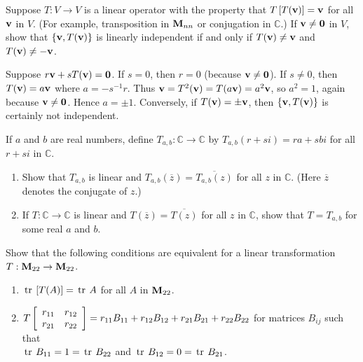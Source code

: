 \begin{multicols}{2}
\begin{ex}
Suppose $T : V \to V$ is a linear operator with the property that $T\left[T(\textbf{v})\right] = \textbf{v}$ for all $\textbf{v}$ in $V$. (For example, transposition in $\textbf{M}_{nn}$ or conjugation in $\mathbb{C}$.) If $\textbf{v} \neq \textbf{0}$ in $V$, show that $\{\textbf{v}, T(\textbf{v})\}$ is linearly independent if and only if $T(\textbf{v}) \neq \textbf{v}$ and $T(\textbf{v}) \neq -\textbf{v}$.

\begin{sol}
Suppose $r\textbf{v} + sT(\textbf{v}) = \textbf{0}$. If $s = 0$, then $r = 0$ (because $\textbf{v} \neq \textbf{0}$). If $s \neq 0$, then $T(\textbf{v}) = a\textbf{v}$ where $a = -s^{-1}r$. Thus $\textbf{v} = T^{2}(\textbf{v}) = T(a\textbf{v}) = a^{2}\textbf{v}$, so $a^{2} = 1$, again because $\textbf{v} \neq \textbf{0}$. Hence $a = \pm 1$. Conversely, if $T(\textbf{v}) = \pm\textbf{v}$, then $\{\textbf{v}, T(\textbf{v})\}$ is certainly not independent.
\end{sol}
\end{ex}

\begin{ex}
If $a$ and $b$ are real numbers, define $T_{a,b} : \mathbb{C} \to \mathbb{C}$ by $T_{a,b}(r + si) = ra + sbi$ for all $r + si$ in $\mathbb{C}$.


\begin{enumerate}[label={\alph*.}]
\item Show that $T_{a,b}$ is linear and $T_{a,b}(\overline{z}) = \overline{T_{a,b}(z)}$ for all $z$ in $\mathbb{C}$. (Here $\overline{z}$ denotes the conjugate of $z$.)

\item If $T : \mathbb{C} \to \mathbb{C}$  is linear and $T(\overline{z}) = \overline{T(z)}$ for all $z$ in $\mathbb{C}$, show that $T = T_{a,b}$ for some real $a$ and $b$.

\end{enumerate}
\end{ex}

\begin{ex}
Show that the following conditions are equivalent for a linear transformation $T : \textbf{M}_{22} \to \textbf{M}_{22}$.


\begin{enumerate}
\item $\thinspace\operatorname{tr\medspace}\left[T(A)\right] = \thinspace\operatorname{tr \medspace}A$ for all $A$ in $\textbf{M}_{22}$.

\item $T\left[ \begin{array}{cc}
r_{11} & r_{12} \\
r_{21} & r_{22}
\end{array} \right] = r_{11}B_{11} + r_{12}B_{12} + r_{21}B_{21} + r_{22}B_{22}$
 for matrices $B_{ij}$ such that\\
$\thinspace\operatorname{tr \medspace}B_{11} = 1 = \thinspace\operatorname{tr \medspace}B_{22}$ and $\thinspace\operatorname{tr \medspace}B_{12} = 0 = \thinspace\operatorname{tr \medspace}B_{21}$.


\end{enumerate}
\end{ex}
\end{multicols}
